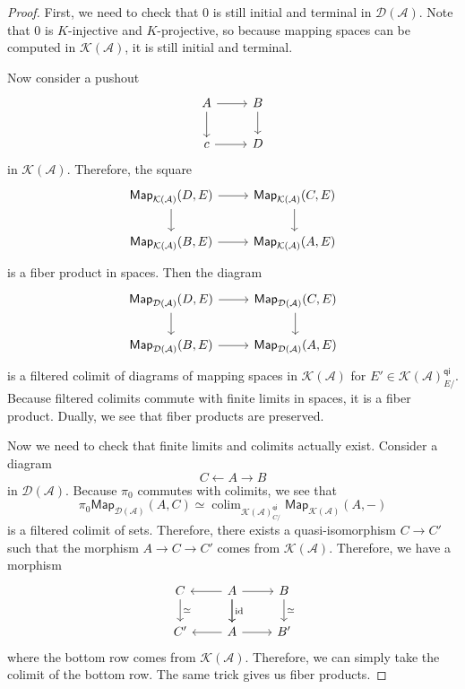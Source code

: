 \documentclass[10pt, oneside]{memoir}
\theoremstyle{definition}
\theoremstyle{remark}
\theoremstyle{plain}
\theoremstyle{definition}
\theoremstyle{remark}
\newcommand{\mc}[1]{\mathcal{#1}}
\newcommand{\mr}[1]{\mathrm{#1}}
\newcommand{\ms}[1]{\mathsf{#1}}
\newcommand{\1}{\mathbf{1}}
\newcommand{\2}{\mathbf{2}}
\newcommand{\3}{\mathbf{3}}
\DeclareMathOperator*{\colim}{colim}
\begin{document}
\begin{proof}
    First, we need to check that \(0 \) is still initial and terminal in \(\mc{D}(\mc{A}) \). Note that \(0 \) is \(K \)-injective and \(K \)-projective, so because mapping spaces can be computed in \(\mc{K}(\mc{A}) \), it is still initial and terminal.

    Now consider a pushout
    \begin{equation*}
    \begin{tikzcd}
        A \ar{r} \ar{d} & B \ar{d} \\
        c \ar{r} & D
    \end{tikzcd}
    \end{equation*}
    in \(\mc{K}(\mc{A}) \). Therefore, the square
    \begin{equation*}
    \begin{tikzcd}
        \ms{Map}_{\mc{K}(\mc{A})}(D, E) \ar{r} \ar{d} & \ms{Map}_{\mc{K}(\mc{A})}(C, E) \ar{d} \\
        \ms{Map}_{\mc{K}(\mc{A})}(B, E) \ar{r} & \ms{Map}_{\mc{K}(\mc{A})}(A, E)
    \end{tikzcd}
    \end{equation*}
    is a fiber product in spaces. Then the diagram
    \begin{equation*}
        \begin{tikzcd}
            \ms{Map}_{\mc{D}(\mc{A})}(D, E) \ar{r} \ar{d} & \ms{Map}_{\mc{D}(\mc{A})}(C, E) \ar{d} \\
            \ms{Map}_{\mc{D}(\mc{A})}(B, E) \ar{r} & \ms{Map}_{\mc{D}(\mc{A})}(A, E)
        \end{tikzcd}
    \end{equation*}
    is a filtered colimit of diagrams of mapping spaces in \(\mc{K}(\mc{A}) \) for \(E' \in \mc{K}(\mc{A})_{E/}^{\ms{qi}} \). Because filtered colimits commute with finite limits in spaces, it is a fiber product. Dually, we see that fiber products are preserved.

    Now we need to check that finite limits and colimits actually exist. Consider a diagram
    \[ C \gets A \to B \]
    in \(\mc{D}(\mc{A}) \). Because \(\pi_0 \) commutes with colimits, we see that
    \[ \pi_0 \ms{Map}_{\mc{D}(\mc{A})}(A, C) \simeq \colim_{\mc{K}(\mc{A})_{C/}^{\ms{qi}}} \ms{Map}_{\mc{K}(\mc{A})}(A, -) \]
    is a filtered colimit of sets. Therefore, there exists a quasi-isomorphism \(C \to C' \) such that the morphism \(A \to C \to C' \) comes from \(\mc{K}(\mc{A}) \). Therefore, we have a morphism
    \begin{equation*}
    \begin{tikzcd}
        C \ar{d}{\simeq} & A \ar{d}{\mr{id}} \ar{l} \ar{r}\ar{d} & B \ar{d}{\simeq} \\
        C' & A \ar{l} \ar{r} & B'
    \end{tikzcd}
    \end{equation*}
    where the bottom row comes from \(\mc{K}(\mc{A}) \). Therefore, we can simply take the colimit of the bottom row. The same trick gives us fiber products.
\end{proof}
\end{document}
